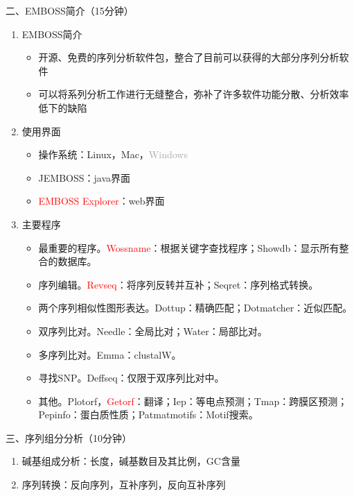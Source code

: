 \documentclass{TIJMUjiaoanSY}
\begin{document}
\vspace*{0.2cm}
\noindent
二、EMBOSS简介（15分钟）
\begin{enumerate}
  \item EMBOSS简介
  \begin{itemize}
    \item 开源、免费的序列分析软件包，整合了目前可以获得的大部分序列分析软件
    \item 可以将系列分析工作进行无缝整合，弥补了许多软件功能分散、分析效率低下的缺陷
  \end{itemize}
  \item 使用界面
  \begin{itemize}
    \item 操作系统：Linux，Mac，\textcolor{darkgray}{Windows}
    \item JEMBOSS：java界面
    \item \textcolor{red}{EMBOSS Explorer}：web界面
  \end{itemize}
  \item 主要程序
  \begin{itemize}
    \item 最重要的程序。\textcolor{red}{Wossname}：根据关键字查找程序；Showdb：显示所有整合的数据库。
    \item 序列编辑。\textcolor{red}{Revseq}：将序列反转并互补；Seqret：序列格式转换。
    \item 两个序列相似性图形表达。Dottup：精确匹配；Dotmatcher：近似匹配。
    \item 双序列比对。Needle：全局比对；Water：局部比对。
    \item 多序列比对。Emma：clustalW。
    \item 寻找SNP。Deffseq：仅限于双序列比对中。
    \item 其他。Plotorf，\textcolor{red}{Getorf}：翻译；Iep：等电点预测；Tmap：跨膜区预测；Pepinfo：蛋白质性质；Patmatmotifs：Motif搜索。
  \end{itemize}
\end{enumerate}

\vspace*{0.2cm}
\noindent
三、序列组分分析（10分钟）
\begin{enumerate}
  \item 碱基组成分析：长度，碱基数目及其比例，GC含量
  \item 序列转换：反向序列，互补序列，反向互补序列
\end{enumerate}


\otherTail
\newpage
\otherHeader
\end{document}

